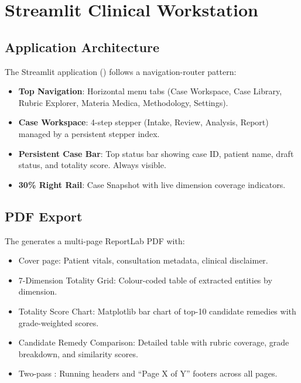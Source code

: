 
\section{Streamlit Clinical Workstation}

\subsection{Application Architecture}

The Streamlit application () follows a navigation-router pattern:
\begin{itemize}
  \item \textbf{Top Navigation}: Horizontal menu tabs (Case Workspace, Case Library, Rubric Explorer, Materia Medica, Methodology, Settings).
  \item \textbf{Case Workspace}: 4-step stepper (Intake, Review, Analysis, Report) managed by a persistent  stepper index.
  \item \textbf{Persistent Case Bar}: Top status bar showing case ID, patient name, draft status, and totality score. Always visible.
  \item \textbf{30\% Right Rail}: Case Snapshot with live dimension coverage indicators.
\end{itemize}

\subsection{PDF Export}

The  generates a multi-page ReportLab PDF with:
\begin{itemize}
  \item Cover page: Patient vitals, consultation metadata, clinical disclaimer.
  \item 7-Dimension Totality Grid: Colour-coded table of extracted entities by dimension.
  \item Totality Score Chart: Matplotlib bar chart of top-10 candidate remedies with grade-weighted scores.
  \item Candidate Remedy Comparison: Detailed table with rubric coverage, grade breakdown, and similarity scores.
  \item Two-pass : Running headers and ``Page X of Y'' footers across all pages.
\end{itemize}

